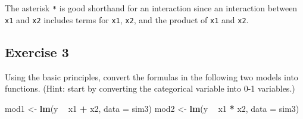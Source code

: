 \documentclass[]{book}
\newenvironment{Shaded}{\begin{snugshade}}{\end{snugshade}}
\newcommand{\ControlFlowTok}[1]{\textcolor[rgb]{0.13,0.29,0.53}{\textbf{#1}}}
\newcommand{\DataTypeTok}[1]{\textcolor[rgb]{0.13,0.29,0.53}{#1}}
\newcommand{\KeywordTok}[1]{\textcolor[rgb]{0.13,0.29,0.53}{\textbf{#1}}}
\newcommand{\NormalTok}[1]{#1}
\newcommand{\OperatorTok}[1]{\textcolor[rgb]{0.81,0.36,0.00}{\textbf{#1}}}
\newcommand{\StringTok}[1]{\textcolor[rgb]{0.31,0.60,0.02}{#1}}
\theoremstyle{definition}
\theoremstyle{definition}
\theoremstyle{definition}
\theoremstyle{remark}
\begin{document}
The asterisk \texttt{*} is good shorthand for an interaction since an
interaction between \texttt{x1} and \texttt{x2} includes terms for
\texttt{x1}, \texttt{x2}, and the product of \texttt{x1} and
\texttt{x2}.

\hypertarget{exercise-3-44}{%
\subsection{Exercise 3}\label{exercise-3-44}}

Using the basic principles, convert the formulas in the following two
models into functions. (Hint: start by converting the categorical
variable into 0-1 variables.)

\begin{Shaded}
\begin{Highlighting}[]
\NormalTok{mod1 <-}\StringTok{ }\KeywordTok{lm}\NormalTok{(y }\OperatorTok{~}\StringTok{ }\NormalTok{x1 }\OperatorTok{+}\StringTok{ }\NormalTok{x2, }\DataTypeTok{data =}\NormalTok{ sim3)}
\NormalTok{mod2 <-}\StringTok{ }\KeywordTok{lm}\NormalTok{(y }\OperatorTok{~}\StringTok{ }\NormalTok{x1 }\OperatorTok{*}\StringTok{ }\NormalTok{x2, }\DataTypeTok{data =}\NormalTok{ sim3)}
\end{Highlighting}
\end{Shaded}

\begin{Shaded}
\end{Shaded}
\end{document}
